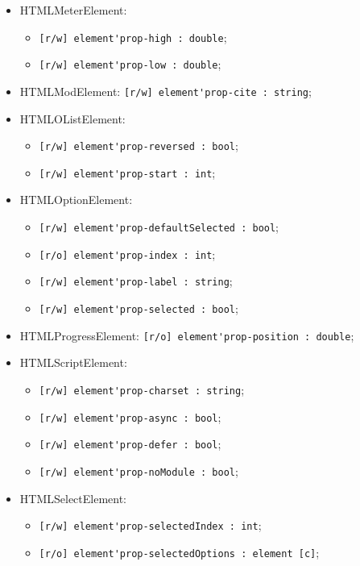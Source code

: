 \documentclass[a4paper, 14pt]{extarticle}
\newenvironment{icItems}
	{ \begin{itemize} [noitemsep,nolistsep] }
	{ \end{itemize} }
\begin{document}
\begin{icItems}
	\item HTMLMeterElement:
	\begin{icItems}
		\item \lstinline|[r/w] element'prop-high : double|;
		\item \lstinline|[r/w] element'prop-low : double|;
	\end{icItems}
	
	\item HTMLModElement: \lstinline|[r/w] element'prop-cite : string|;
	
	\item HTMLOListElement:
	\begin{icItems}
		\item \lstinline|[r/w] element'prop-reversed : bool|;
		\item \lstinline|[r/w] element'prop-start : int|;
	\end{icItems}
	
	\item HTMLOptionElement:
	\begin{icItems}
		\item \lstinline|[r/w] element'prop-defaultSelected : bool|;
		\item \lstinline|[r/o] element'prop-index : int|;
		\item \lstinline|[r/w] element'prop-label : string|;
		\item \lstinline|[r/w] element'prop-selected : bool|;
	\end{icItems}
	
	\item HTMLProgressElement: \lstinline|[r/o] element'prop-position : double|;
	
	\item HTMLScriptElement:
	\begin{icItems}
		\item \lstinline|[r/w] element'prop-charset : string|;
		\item \lstinline|[r/w] element'prop-async : bool|;
		\item \lstinline|[r/w] element'prop-defer : bool|;
		\item \lstinline|[r/w] element'prop-noModule : bool|;
	\end{icItems}
	
	\item HTMLSelectElement:
	\begin{icItems}
		\item \lstinline|[r/w] element'prop-selectedIndex : int|;
		\item \lstinline|[r/o] element'prop-selectedOptions : element [c]|;
	\end{icItems}
	

\end{icItems}
\end{document}
